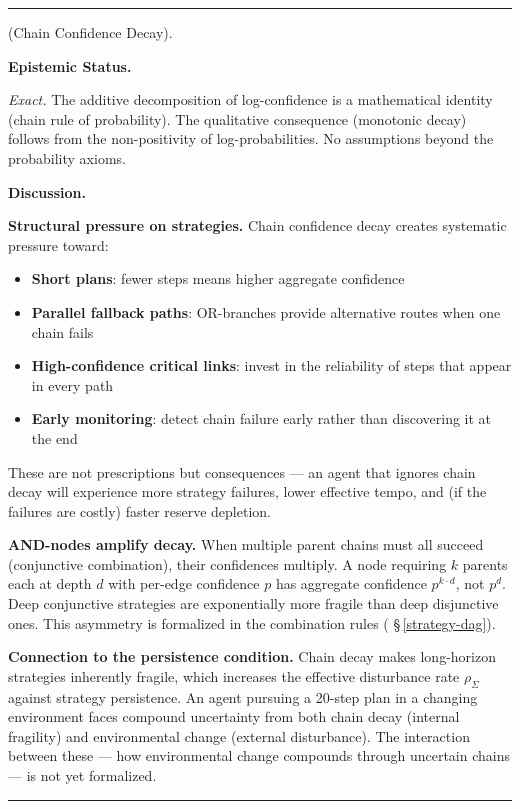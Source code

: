\documentclass[11pt,oneside]{article}
\newcounter{claim}[section]
\renewcommand{\theclaim}{\thesection.\arabic{claim}}
\newenvironment{segment}[2]{%
  \refstepcounter{claim}%
  \bigskip\noindent\hrule\smallskip
  \noindent{\bfseries #1~\theclaim}\enskip(#2).\par\smallskip
  \noindent\ignorespaces
}{%
  \par\smallskip\noindent\hrule\bigskip
}
\newenvironment{proposition}[1][]{\begin{segment}{Proposition}{#1}}{\end{segment}}
\begin{document}
\begin{proposition}[Chain Confidence Decay]
\medskip\noindent\textbf{Epistemic Status.}


\textit{Exact.} The additive decomposition of log-confidence is a mathematical identity (chain rule of probability). The qualitative consequence (monotonic decay) follows from the non-positivity of log-probabilities. No assumptions beyond the probability axioms.


\medskip\noindent\textbf{Discussion.}


\textbf{Structural pressure on strategies.} Chain confidence decay creates systematic pressure toward:
\begin{itemize}
  \item \textbf{Short plans}: fewer steps means higher aggregate confidence
  \item \textbf{Parallel fallback paths}: OR-branches provide alternative routes when one chain fails
  \item \textbf{High-confidence critical links}: invest in the reliability of steps that appear in every path
  \item \textbf{Early monitoring}: detect chain failure early rather than discovering it at the end
\end{itemize}


These are not prescriptions but consequences — an agent that ignores chain decay will experience more strategy failures, lower effective tempo, and (if the failures are costly) faster reserve depletion.

\textbf{AND-nodes amplify decay.} When multiple parent chains must all succeed (conjunctive combination), their confidences multiply. A node requiring $k$ parents each at depth $d$ with per-edge confidence $p$ has aggregate confidence $p^{k \cdot d}$, not $p^d$. Deep conjunctive strategies are exponentially more fragile than deep disjunctive ones. This asymmetry is formalized in the combination rules ( \S\,\ref{strategy-dag}).

\textbf{Connection to the persistence condition.} Chain decay makes long-horizon strategies inherently fragile, which increases the effective disturbance rate $\rho_\Sigma$ against strategy persistence. An agent pursuing a 20-step plan in a changing environment faces compound uncertainty from both chain decay (internal fragility) and environmental change (external disturbance). The interaction between these — how environmental change compounds through uncertain chains — is not yet formalized.


\end{proposition}
\end{document}
